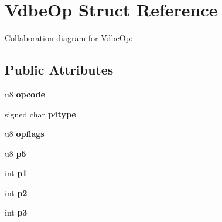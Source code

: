 \hypertarget{struct_vdbe_op}{\section{Vdbe\+Op Struct Reference}
\label{struct_vdbe_op}
}


Collaboration diagram for Vdbe\+Op\+:
\subsection*{Public Attributes}
\begin{DoxyCompactItemize}
\item 
\hypertarget{struct_vdbe_op_ae12a8e7a8f5f7ba39fa379c9ad287837}{u8 {\bfseries opcode}}\label{struct_vdbe_op_ae12a8e7a8f5f7ba39fa379c9ad287837}

\item 
\hypertarget{struct_vdbe_op_a124dee58d3e0d73c7dfaf811a3311023}{signed char {\bfseries p4type}}\label{struct_vdbe_op_a124dee58d3e0d73c7dfaf811a3311023}

\item 
\hypertarget{struct_vdbe_op_a169a7bbe99a90c26ee01833723750b1d}{u8 {\bfseries opflags}}\label{struct_vdbe_op_a169a7bbe99a90c26ee01833723750b1d}

\item 
\hypertarget{struct_vdbe_op_a5e807981f52d29c06a5b6d4a8f2f4595}{u8 {\bfseries p5}}\label{struct_vdbe_op_a5e807981f52d29c06a5b6d4a8f2f4595}

\item 
\hypertarget{struct_vdbe_op_a17c8326a1e3ac5612d4aaaa88f383b3b}{int {\bfseries p1}}\label{struct_vdbe_op_a17c8326a1e3ac5612d4aaaa88f383b3b}

\item 
\hypertarget{struct_vdbe_op_aba021fa9d30343c16794d9b76d8bffcd}{int {\bfseries p2}}\label{struct_vdbe_op_aba021fa9d30343c16794d9b76d8bffcd}

\item 
\hypertarget{struct_vdbe_op_ad7ef3319da20d5423b8cc5da6995d193}{int {\bfseries p3}}\label{struct_vdbe_op_ad7ef3319da20d5423b8cc5da6995d193}


\end{DoxyCompactItemize}
